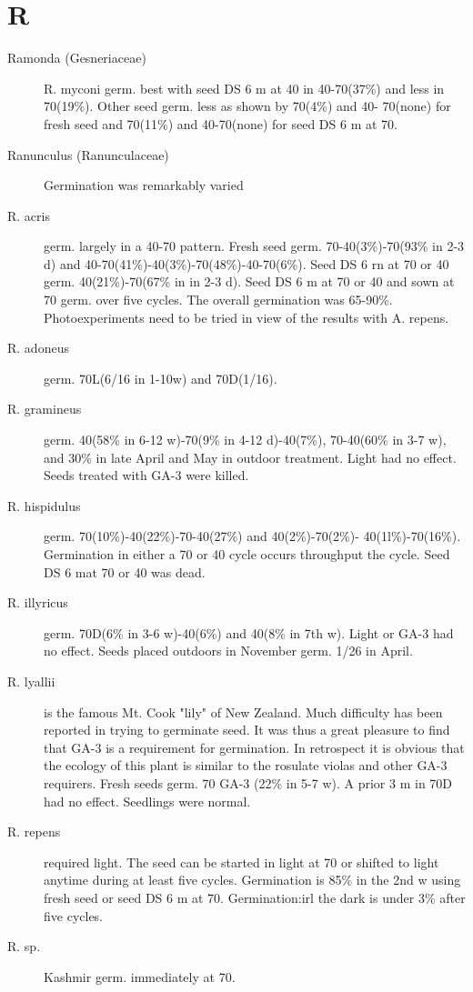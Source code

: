 \section{R}
\begin{description}

\item[Ramonda (Gesneriaceae)] R. myconi germ. best with seed DS 6 m at 40 in
40-70(37\%) and less in 70(19\%). Other seed germ. less as shown by 70(4\%) and 40-
70(none) for fresh seed and 70(11\%) and 40-70(none) for seed DS 6 m at 70.

\item[Ranunculus (Ranunculaceae)] Germination was remarkably varied
\item[R. acris] germ. largely in a 40-70 pattern. Fresh seed germ. 70-40(3\%)-70(93\%
in 2-3 d) and 40-70(41\%)-40(3\%)-70(48\%)-40-70(6\%). Seed DS 6 rn at 70 or 40
germ. 40(21\%)-70(67\% in in 2-3 d). Seed DS 6 m at 70 or 40 and sown at 70 germ.
over five cycles. The overall germination was 65-90\%. Photoexperiments need to be
tried in view of the results with A. repens.
\item[R. adoneus] germ. 70L(6/16 in 1-10w) and 70D(1/16).
\item[R. gramineus] germ. 40(58\% in 6-12 w)-70(9\% in 4-12 d)-40(7\%), 70-40(60\% in
3-7 w), and 30\% in late April and May in outdoor treatment. Light had no effect.
Seeds treated with GA-3 were killed.
\item[R. hispidulus] germ. 70(10\%)-40(22\%)-70-40(27\%) and 40(2\%)-70(2\%)-
40(1l\%)-70(16\%). Germination in either a 70 or 40 cycle occurs throughput the cycle.
Seed DS 6 mat 70 or 40 was dead.
\item[R. illyricus] germ. 70D(6\% in 3-6 w)-40(6\%) and 40(8\% in 7th w). Light or GA-3
had no effect. Seeds placed outdoors in November germ. 1/26 in April.
\item[R. lyallii] is the famous Mt. Cook "lily" of New Zealand. Much difficulty has been
reported in trying to germinate seed. It was thus a great pleasure to find that GA-3 is a
requirement for germination. In retrospect it is obvious that the ecology of this plant is
similar to the rosulate violas and other GA-3 requirers. Fresh seeds germ. 70 GA-3
(22\% in 5-7 w). A prior 3 m in 70D had no effect. Seedlings were normal.
\item[R. repens] required light. The seed can be started in light at 70 or shifted to light
anytime during at least five cycles. Germination is 85\% in the 2nd w using fresh seed
or seed DS 6 m at 70. Germination:irl the dark is under 3\% after five cycles.
\item[R. sp.] Kashmir germ. immediately at 70.


\end{description}
